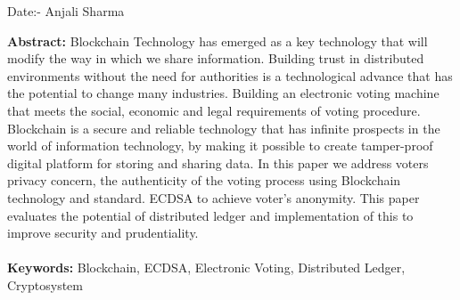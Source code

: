 \documentclass{report}
\begin{document}
\vspace{1.0in}
 
 Date:- \hfill Anjali Sharma 




\tableofcontents
\pagebreak
\textbf{Abstract:}
Blockchain Technology has emerged as a key technology that will modify the way in which we share information. Building trust in distributed environments without the need for authorities is a technological advance that has the potential to change many industries.
Building an electronic voting machine that meets the social, economic and legal requirements of voting procedure. Blockchain is a secure and reliable technology that has infinite prospects in the world of information technology, by making it possible to create tamper-proof digital platform for storing and sharing data. In this paper we address voters privacy concern, the authenticity of the voting process using Blockchain technology and standard. ECDSA to achieve voter's anonymity. This paper evaluates the potential of distributed ledger and implementation of this to improve security and prudentiality.\\
\\
\textbf{Keywords:} Blockchain, ECDSA, Electronic Voting, Distributed Ledger, Cryptosystem
\end{document}
